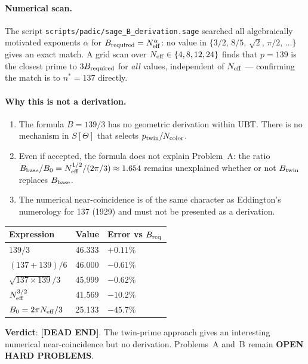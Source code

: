 \documentclass[11pt,a4paper]{article}
\theoremstyle{remark}
\begin{document}
\paragraph{Numerical scan.}
The script \texttt{scripts/padic/sage\_B\_derivation.sage} searched all algebraically
motivated exponents $\alpha$ for $B_{\rm required} = N_{\rm eff}^\alpha$:
no value in $\{3/2,\,8/5,\,\sqrt{2},\,\pi/2,\,\ldots\}$ gives an exact match.
A grid scan over $N_{\rm eff} \in \{4, 8, 12, 24\}$ finds that $p = 139$ is the
closest prime to $3 B_{\rm required}$ for \emph{all} values, independent of
$N_{\rm eff}$ — confirming the match is to $n^* = 137$ directly.

\paragraph{Why this is not a derivation.}
\begin{enumerate}
  \item The formula $B = 139/3$ has no geometric derivation within UBT.
        There is no mechanism in $S[\Theta]$ that selects $p_{\rm twin}/N_{\rm color}$.
  \item Even if accepted, the formula does not explain Problem~A:
        the ratio $B_{\rm base}/B_0 = N_{\rm eff}^{1/2}/(2\pi/3) \approx 1.654$ remains
        unexplained whether or not $B_{\rm twin}$ replaces $B_{\rm base}$.
  \item The numerical near-coincidence is of the same character as Eddington's numerology
        for 137 (1929) and must not be presented as a derivation.
\end{enumerate}

\begin{center}
\begin{tabular}{lll}
\hline
\textbf{Expression} & \textbf{Value} & \textbf{Error vs $B_{\rm req}$} \\
\hline
$139/3$               & 46.333  & $+0.11\%$ \\
$(137+139)/6$         & 46.000  & $-0.61\%$ \\
$\sqrt{137\times139}/3$ & 45.999 & $-0.62\%$ \\
$N_{\rm eff}^{3/2}$   & 41.569  & $-10.2\%$ \\
$B_0 = 2\pi N_{\rm eff}/3$ & 25.133 & $-45.7\%$ \\
\hline
\end{tabular}
\end{center}

\textbf{Verdict}: \textbf{[DEAD END]}.
The twin-prime approach gives an interesting numerical near-coincidence but no derivation.
Problems~A and~B remain \textbf{OPEN HARD PROBLEMS}.
\end{document}
